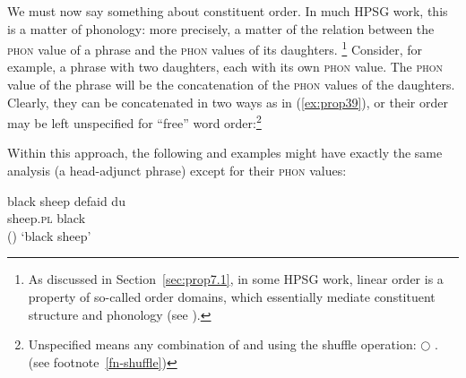 \documentclass[output=paper,biblatex,babelshorthands,newtxmath,draftmode,colorlinks,citecolor=brown]{langscibook}
\begin{document}
We must now say something about constituent order. In much HPSG work, this is a matter of phonology:
more precisely, a matter of the relation between the \textsc{phon} value of a phrase and the
\textsc{phon} values of its daughters.%
%
\footnote{As discussed in Section~\ref{sec:prop7.1}, in some HPSG work, linear order is a property
  of so-called order domains, which essentially mediate constituent structure and phonology (see
  ). } 
%
Consider, for example, a phrase with two daughters, each with its own \textsc{phon} value. The
\textsc{phon} value of the phrase will be the concatenation of the \textsc{phon} values of the
daughters. Clearly, they can be concatenated in two ways as in (\ref{ex:prop39}),
or their order may be left unspecified for ``free'' word order:\footnote{
Unspecified means any combination of  and  using the shuffle operation: 
$\bigcirc$ . (see footnote~\ref{fn-shuffle})
}

\eal
\label{ex:prop39}\label{ex-phon-concatenation}
\ex
{}
\ex
{}
\zl

\noindent
Within this approach, the following  and  examples might have exactly the same analysis (a head-adjunct phrase) except for their \textsc{phon} values:

\eal\label{ex:prop40}
\ex\label{ex:prop40a}
black sheep
\ex\label{ex:prop40b}
\gll defaid            du\\
     sheep.\textsc{pl} black\\\hfill()
\glt `black sheep'
\zl
\end{document}
